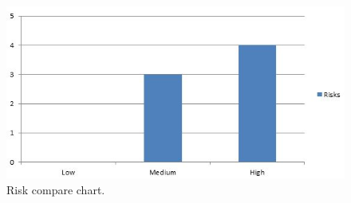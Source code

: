 \begin{figure}[h!]
  \centering
    \includegraphics{./Graphics/riskchart.jpg}
 \caption{Risk compare chart.}
\end{figure}
